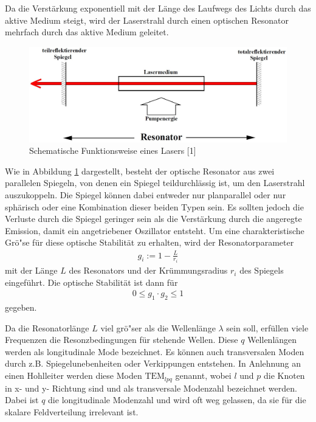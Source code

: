 \documentclass[captions=tableheading]{scrartcl}
\begin{document}
Da die Verstärkung exponentiell mit der Länge des Laufwegs des Lichts durch das aktive Medium steigt, wird der Laserstrahl durch einen optischen Resonator mehrfach durch das aktive Medium geleitet.

\begin{figure}[h]
 \centering
  \includegraphics[width=12cm]{images/schema_resonator.jpg}
 \caption{Schematische Funktionsweise eines Lasers [1]} 
  \label{fig:schema_resonator}
\end{figure}

Wie in Abbildung \ref{fig:schema_resonator} dargestellt, besteht der optische Resonator aus zwei parallelen Spiegeln, von denen ein Spiegel teildurchlässig ist, um den Laserstrahl auszukoppeln.
Die Spiegel können dabei entweder nur planparallel oder nur sphärisch oder eine Kombination dieser beiden Typen sein.
Es sollten jedoch die Verluste durch die Spiegel geringer sein als die Verstärkung durch die angeregte Emission, damit ein angetriebener Oszillator entsteht.
Um eine charakteristische Grö"se für diese optische Stabilität zu erhalten, wird der Resonatorparameter
\begin{align}
 g_i := 1- \frac{L}{r_i}
\end{align}
mit der Länge $L$ des Resonators und der Krümmungsradius $r_i$ des Spiegels eingeführt.
Die optische Stabilität ist dann für
\begin{align}
0 \le g_1 \cdot g_2 \le 1 
\label{eq:stabilitaet}
\end{align}
gegeben.

Da die Resonatorlänge $L$ viel grö"ser als die Wellenlänge $\lambda$ sein soll, erfüllen viele Frequenzen die Resonzbedingungen für stehende Wellen. 
Diese $q$ Wellenlängen werden als longitudinale Mode bezeichnet. Es können auch transversalen Moden durch z.B. Spiegelunebenheiten oder Verkippungen entstehen.
In Anlehnung an einen Hohlleiter werden diese Moden $\text{TEM}_{lpq}$ genannt, wobei $l$ und $p$ die Knoten in x- und y- Richtung sind und als transversale Modenzahl bezeichnet werden.
Dabei ist $q$ die longitudinale Modenzahl und wird oft weg gelassen, da sie für die skalare Feldverteilung irrelevant ist.  
\end{document}
